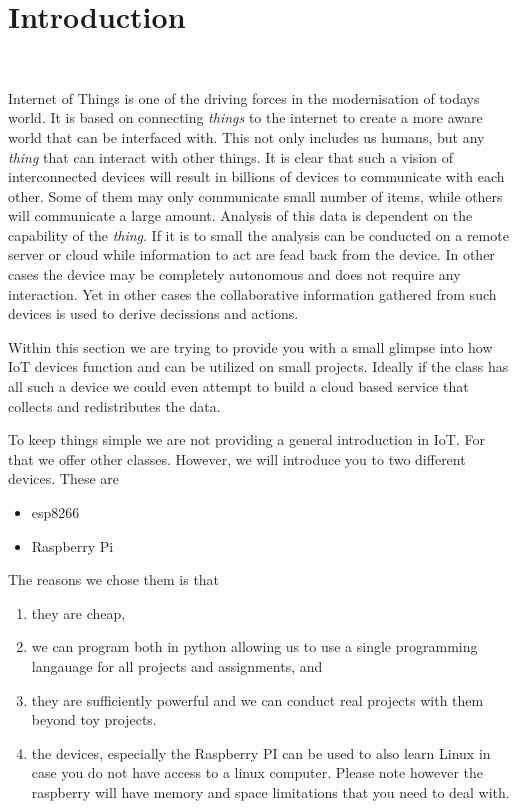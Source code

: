 

\chapter{Introduction}

\FILENAME\

Internet of Things is one of the driving forces in the modernisation of
todays world. It is based on connecting \emph{things} to the internet to
create a more aware world that can be interfaced with. This not only
includes us humans, but any \emph{thing} that can interact with other
things. It is clear that such a vision of interconnected devices will
result in billions of devices to communicate with each other. Some of
them may only communicate small number of items, while others will
communicate a large amount. Analysis of this data is dependent on the
capability of the \emph{thing}. If it is to small the analysis can be
conducted on a remote server or cloud while information to act are fead
back from the device. In other cases the device may be completely
autonomous and does not require any interaction. Yet in other cases the
collaborative information gathered from such devices is used to derive
decissions and actions.

Within this section we are trying to provide you with a small glimpse
into how IoT devices function and can be utilized on small projects.
Ideally if the class has all such a device we could even attempt to
build a cloud based service that collects and redistributes the data.

To keep things simple we are not providing a general introduction in
IoT. For that we offer other classes. However, we will introduce you to
two different devices. These are

\begin{itemize}

\item
  esp8266
\item
  Raspberry Pi
\end{itemize}

The reasons we chose them is that

\begin{enumerate}
\def\labelenumi{\arabic{enumi}.}

\item
  they are cheap,
\item
  we can program both in python allowing us to use a single programming
  langauage for all projects and assignments, and
\item
  they are sufficiently powerful and we can conduct real projects with
  them beyond toy projects.
\item
  the devices, especially the Raspberry PI can be used to also learn
  Linux in case you do not have access to a linux computer. Please note
  however the raspberry will have memory and space limitations that you
  need to deal with.
\end{enumerate}

